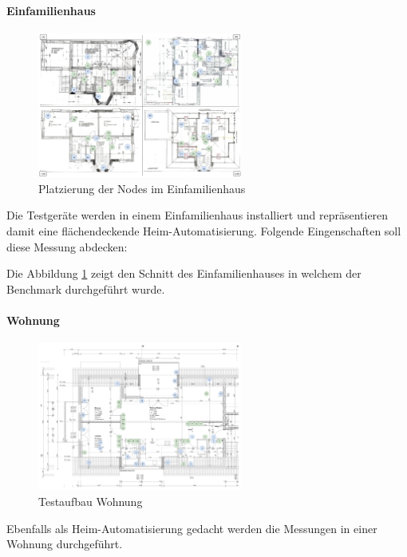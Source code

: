\paragraph{Einfamilienhaus}
\begin{figure}
	\centering
	\vspace{-105pt}
	\includegraphics[width=0.6\textwidth]{graphics/Plan_Haus_Raffi.png}
	\caption{Platzierung der Nodes im Einfamilienhaus}\label{fig:Messumgebung2Einfamilienhaus}
	\vspace{-50pt}
\end{figure}
Die Testgeräte werden in einem Einfamilienhaus installiert und repräsentieren damit eine flächendeckende Heim-Automatisierung. Folgende Eingenschaften soll diese Messung abdecken:

Die Abbildung \ref{fig:Messumgebung2Einfamilienhaus} zeigt den Schnitt des Einfamilienhauses in welchem der Benchmark durchgeführt wurde.

\newpage
\paragraph{Wohnung}
\begin{figure}
	\centering
	\vspace{-80pt}
	\includegraphics[width=0.6\textwidth]{graphics/Plan_Wohnung_Cyrill_Nodes_Placement.png}
	\caption{Testaufbau Wohnung}
	\label{fig:TestaufbauWohnung}
	\vspace{-100pt}
\end{figure}
Ebenfalls als Heim-Automatisierung gedacht werden die Messungen in einer Wohnung durchgeführt.


